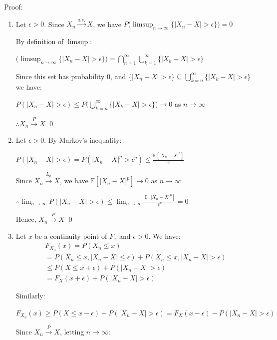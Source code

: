 \documentclass[10pt]{article}
\begin{document}
Proof: 

\begin{enumerate}[label=\textit{(\roman*)}]
    \item Let $\epsilon > 0$. Since $X_n \xrightarrow{a.s.} X$, we have $P\big(\limsup_{n \to \infty}\{|X_n - X| > \epsilon\}\big) = 0$
    
    By definition of $\limsup$:

    $\big(\limsup_{n \to \infty}\{|X_n - X| > \epsilon\}\big) = \bigcap_{n = 1}^\infty\bigcup_{k = 1}^\infty\{|X_k - X| > \epsilon\}$

    Since this set has probability 0, and $\{|X_n - X| > \epsilon\} \subseteq \bigcup_{k = n}^\infty\{|X_k - X| > \epsilon\}$ we have: 

    $P(|X_n - X| > \epsilon) \leq P\big(\bigcup_{k = n}^\infty\{|X_k - X| > \epsilon\}\big) \to 0$ as $n \to \infty$

    $\therefore X_n \xrightarrow{P} X$ \qed
    \setcounter{enumi}{2}
    \newpage
    \item Let $\epsilon > 0$. By Markov's inequality:
    
    $P(|X_n - X| > \epsilon) = P(|X_n - X|^p > \epsilon^p) \leq \frac{\mathbb{E}[|X_n - X|^p]}{\epsilon^p}$

    Since $X_n \xrightarrow{L_p} X$, we have $\mathbb{E}[|X_n - X|^p] \to 0$ as $n \to \infty$

    $\therefore \lim_{n \to \infty} P(|X_n - X| > \epsilon) \leq \lim_{n \to\infty}\frac{\mathbb{E}[|X_n - X|^p]}{\epsilon^p} = 0$ 

    Hence, $X_n \xrightarrow{P} X$ \qed

    \item Let $x$ be a continuity point of $F_x$ and $\epsilon > 0$. We have: 
    \begin{gather*}
        F_{X_n}(x) = P(X_n \leq x) \\
        = P(X_n \leq x, |X_n - X| \leq \epsilon) + P(X_n \leq x, |X_n - X| > \epsilon) \\
        \leq P(X \leq x + \epsilon) + P(|X_n - X| > \epsilon) \\
        = F_X(x + \epsilon) + P(|X_n - X| > \epsilon)
    \end{gather*}

    Similarly: 
    
    $F_{X_n}(x) \geq P(X \leq x - \epsilon) - P(|X_n - X| > \epsilon) = F_X(x - \epsilon) - P(|X_n - X| > \epsilon)$

    Since $X_n \xrightarrow{P} X$, letting $n\to\infty$:


\end{enumerate}
\end{document}
